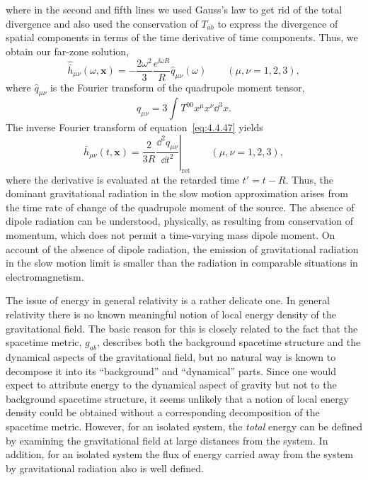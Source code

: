 where in the second and fifth lines we used Gauss's law to get rid of the total
divergence and also used the conservation of \(T_{ab}\) to express the divergence
of spatial components in terms of the time derivative of time components. Thus, we
obtain our far-zone solution,
\begin{equation}
  \widehat{\bar h}_{\mu\nu}(\omega,\mathbf{x})
    =-\frac{2\omega^2}{3}\frac{e^{\ii\omega R}}{R}\widehat q_{\mu\nu}(\omega)
    \qquad(\mu,\nu=1,2,3) ,
  \tag{4.4.47}\label{eq:4.4.47}
\end{equation}
where \(\widehat q_{\mu\nu}\) is the Fourier transform of the quadrupole moment
tensor,
\begin{equation}
  q_{\mu\nu}=3\int T^{00}x^\mu x^\nu\dd^3x .
  \tag{4.4.48}\label{eq:4.4.48}
\end{equation}
The inverse Fourier transform of equation~\eqref{eq:4.4.47} yields
\begin{equation}
  \bar h_{\mu\nu}(t,\mathbf{x})
    =\left.\frac{2}{3R}\frac{\dd^2q_{\mu\nu}}{\dd t^2}\right|_{\mathrm{ret}}
    \qquad(\mu,\nu=1,2,3) ,
  \tag{4.4.49}\label{eq:4.4.49}
\end{equation}
where the derivative is evaluated at the retarded time \(t'=t-R\). Thus, the
dominant gravitational radiation in the slow motion approximation arises from the
time rate of change of the quadrupole moment of the source. The absence of dipole
radiation can be understood, physically, as resulting from conservation of
momentum, which does not permit a time-varying mass dipole moment. On account
of the absence of dipole radiation, the emission of gravitational radiation in the
slow motion limit is smaller than the radiation in comparable situations in
electromagnetism.

The issue of energy in general relativity is a rather delicate one. In general
relativity there is no known meaningful notion of local energy density of the
gravitational field. The basic reason for this is closely related to the fact that the
spacetime metric, \(g_{ab}\), describes both the background spacetime structure and
the dynamical aspects of the gravitational field, but no natural way is known to
decompose it into its ``background'' and ``dynamical'' parts. Since one would
expect to attribute energy to the dynamical aspect of gravity but not to the
background spacetime structure, it seems unlikely that a notion of local energy
density could be obtained without a corresponding decomposition of the spacetime
metric. However, for an isolated system, the \emph{total} energy can be defined by
examining the gravitational field at large distances from the system. In addition,
for an isolated system the flux of energy carried away from the system by
gravitational radiation also is well defined.

